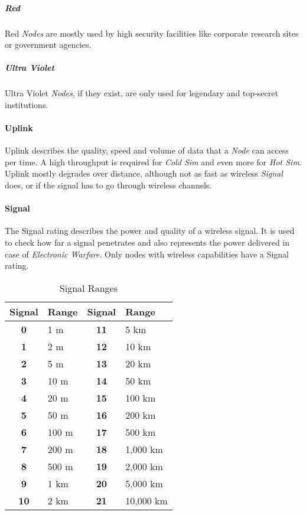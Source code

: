 \subparagraph{Red} Red \emph{Nodes} are mostly used by high security facilities like
corporate research sites or  government agencies.

\subparagraph{Ultra Violet} Ultra Violet \emph{Nodes}, if they exist, are only used
for legendary and top-secret institutions.


\paragraph{Uplink}

Uplink describes the quality, speed and volume of data that a \emph{Node}
can access per time. A high throughput is required for \emph{Cold Sim} and even
more for \emph{Hot Sim}. Uplink mostly degrades over distance, although not as
fast as wireless \emph{Signal} does, or if the signal has to go through wireless
channels.

\paragraph{Signal}

The Signal rating describes the power and quality of a wireless signal. It is
used to check how far a signal penetrates and also represents the power delivered
in case of \emph{Electronic Warfare}.
Only nodes with wireless capabilities have a Signal rating.

\begin{table}[htb]
    \caption[Signal Ranges]{Signal Ranges}
    \label{tab:signal ranges}
    \centering
    \begin{tabular}{clcl}
        \toprule
        \textbf{Signal} & \textbf{Range} & \textbf{Signal} & \textbf{Range} \\
        \midrule
        \textbf{0}      & 1 m            & \textbf{11}     & 5 km           \\
        \textbf{1}      & 2 m            & \textbf{12}     & 10 km          \\
        \textbf{2}      & 5 m            & \textbf{13}     & 20 km          \\
        \textbf{3}      & 10 m           & \textbf{14}     & 50 km          \\
        \textbf{4}      & 20 m           & \textbf{15}     & 100 km         \\
        \textbf{5}      & 50 m           & \textbf{16}     & 200 km         \\
        \textbf{6}      & 100 m          & \textbf{17}     & 500 km         \\
        \textbf{7}      & 200 m          & \textbf{18}     & 1,000 km       \\
        \textbf{8}      & 500 m          & \textbf{19}     & 2,000 km       \\
        \textbf{9}      & 1 km           & \textbf{20}     & 5,000 km       \\
        \textbf{10}     & 2 km           & \textbf{21}     & 10,000 km      \\
        \bottomrule
    \end{tabular}
\end{table}


